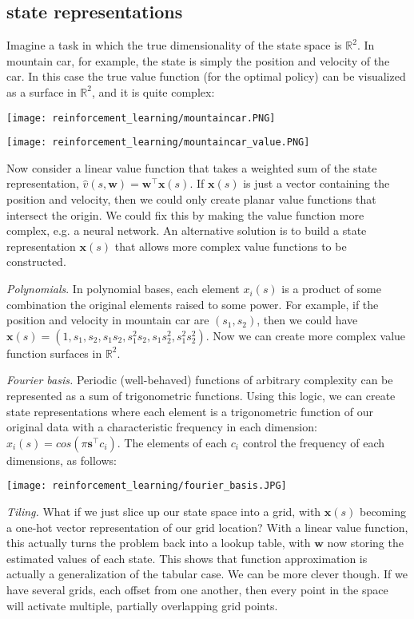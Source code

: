 \subsection{state representations}
Imagine a task in which the true dimensionality of the state space is $\mathbb{R}^2$. In mountain car, for example, the state is simply the position and velocity of the car. In this case the true value function (for the optimal policy) can be visualized as a surface in $\mathbb{R}^2$, and it is quite complex:
\begin{center}\texttt{[image: reinforcement\_learning/mountaincar.PNG]}\end{center}
\begin{center}\texttt{[image: reinforcement\_learning/mountaincar\_value.PNG]}\end{center}

Now consider a linear value function that takes a weighted sum of the state representation, $\hat{v}(s, \mathbf{w}) = \mathbf{w}^\top \mathbf{x}(s)$. If $\mathbf{x}(s)$ is just a vector containing the position and velocity, then we could only create planar value functions that intersect the origin. We could fix this by making the value function more complex, e.g. a neural network. An alternative solution is to build a state representation $\mathbf{x}(s)$ that allows more complex value functions to be constructed.

\textit{Polynomials}. In polynomial bases, each element $x_i(s)$ is a product of some combination the original elements raised to some power. For example, if the position and velocity in mountain car are $(s_1, s_2)$, then we could have $\mathbf{x}(s) = (1, s_1, s_2, s_1s_2, s_1^2s_2, s_1s_2^2,s_1^2s_2^2)$. Now we can create more complex value function surfaces in $\mathbb{R}^2$.

\textit{Fourier basis.} Periodic (well-behaved) functions of arbitrary complexity can be represented as a sum of trigonometric functions. Using this logic, we can create state representations where each element is a trigonometric function of our original data with a characteristic frequency in each dimension: $x_i(s) = cos(\pi \mathbf{s}^\top c_i)$. The elements of each $c_i$ control the frequency of each dimensions, as follows:
\begin{center}\texttt{[image: reinforcement\_learning/fourier\_basis.JPG]}\end{center}

\textit{Tiling.} What if we just slice up our state space into a grid, with $\mathbf{x}(s)$ becoming a one-hot vector representation of our grid location? With a linear value function, this actually turns the problem back into a lookup table, with $\mathbf{w}$ now storing the estimated values of each state. This shows that function approximation is actually a generalization of the tabular case. We can be more clever though. If we have several grids, each offset from one another, then every point in the space will activate multiple, partially overlapping grid points.

